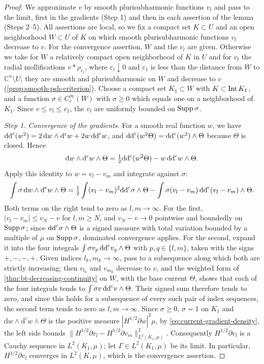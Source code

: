 \begin{proof}
We approximate $v$ by smooth plurisubharmonic functions $v_l$ and pass to the limit, first in the gradients (Step 1) and then in each assertion of the lemma (Steps 2--5). All assertions are local, so we fix a compact set $K\subset U$ and an open neighborhood $W\subset U$ of $K$ on which smooth plurisubharmonic functions $v_l$ decrease to $v$. For the convergence assertion, $W$ and the $v_l$ are given. Otherwise we take for $W$ a relatively compact open neighborhood of $K$ in $U$ and for $v_l$ the radial mollifications $v*\rho_{\varepsilon_l}$, where $\varepsilon_l\downarrow0$ and $\varepsilon_1$ is less than the distance from $\overline W$ to $\mathbb C^n\setminus U$; they are smooth and plurisubharmonic on $W$ and decrease to $v$ (\cref{prop:smooth-psh-criterion}). Choose a compact set $K_1\subset W$ with $K\subset\operatorname{Int} K_1$, and a function $\sigma\in C^\infty_c(W)$ with $\sigma\geq0$ which equals one on a neighborhood of $K_1$. Since $v\leq v_l\leq v_1$, the $v_l$ are uniformly bounded on $\operatorname{Supp}\sigma$.

\emph{Step 1. Convergence of the gradients.}
For a smooth real function $w$, we have $\mathrm{dd}^{\mathrm{c}}(w^2)=2\,\mathrm dw\wedge\mathrm d^{\mathrm c}w+2w\,\mathrm{dd}^{\mathrm{c}} w$, and $\mathrm{dd}^{\mathrm{c}}(w^2\Theta)=\mathrm{dd}^{\mathrm{c}}(w^2)\wedge\Theta$ because $\Theta$ is closed. Hence
\[
 \mathrm dw\wedge\mathrm d^{\mathrm c}w\wedge\Theta
       =\tfrac12\mathrm{dd}^{\mathrm{c}}(w^2\Theta)-w\,\mathrm{dd}^{\mathrm{c}} w\wedge\Theta.
\]
Apply this identity to $w=v_l-v_m$ and integrate against $\sigma$:
\[
 \int\sigma\,\mathrm dw\wedge\mathrm d^{\mathrm c}w\wedge\Theta
 =\tfrac12\int(v_l-v_m)^2\mathrm{dd}^{\mathrm{c}}\sigma\wedge\Theta
  -\int\sigma(v_l-v_m)\,\mathrm{dd}^{\mathrm{c}}(v_l-v_m)\wedge\Theta.
\]
Both terms on the right tend to zero as $l,m\to\infty$. For the first, $|v_l-v_m|\leq v_N-v$ for $l,m\geq N$, and $v_N-v\to0$ pointwise and boundedly on $\operatorname{Supp}\sigma$; since $\mathrm{dd}^{\mathrm{c}}\sigma\wedge\Theta$ is a signed measure with total variation bounded by a multiple of $\mu$ on $\operatorname{Supp}\sigma$, dominated convergence applies. For the second, expand it into the four integrals $\int\sigma v_p\,\mathrm{dd}^{\mathrm{c}} v_q\wedge\Theta$ with $p,q\in\{l,m\}$, taken with the signs $+,-,-,+$. Given indices $l_k,m_k\to\infty$, pass to a subsequence along which both are strictly increasing; then $v_{l_k}$ and $v_{m_k}$ decrease to $v$, and the weighted form of \cref{thm:bt-decreasing-continuity} on $W$, with the base current $\Theta$, shows that each of the four integrals tends to $\int\sigma v\,\mathrm{dd}^{\mathrm{c}} v\wedge\Theta$. Their signed sum therefore tends to zero, and since this holds for a subsequence of every such pair of index sequences, the second term tends to zero as $l,m\to\infty$. Since $\sigma\geq0$, $\sigma=1$ on $K_1$ and $\mathrm dw\wedge\mathrm d^{\mathrm c}w\wedge\Theta$ is the positive measure $|H^{1/2}\partial w|^2\mu$, by \eqref{eq:current-gradient-density}, the left side bounds $\|H^{1/2}\partial v_l-H^{1/2}\partial v_m\|_{L^2(K_1,\mu)}^2$. Consequently $H^{1/2}\partial v_l$ is a Cauchy sequence in $L^2(K_1,\mu)$; let $\Gamma\in L^2(K_1,\mu)$ be its limit. In particular, $H^{1/2}\partial v_l$ converges in $L^2(K,\mu)$, which is the convergence assertion.


\end{proof}
